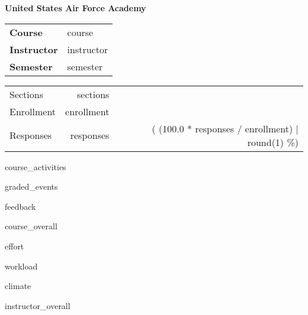 \documentclass{article}
\begin{document}
{\bfseries\large United States Air Force Academy}

\smallskip  %
\begin{minipage}{0.67\linewidth}
  \begin{tabular}{@{}>{\bfseries}ll}
    Course & {{ course }}\\
    Instructor & {{ instructor }}\\
    Semester & {{ semester }}\\
  \end{tabular}
\end{minipage}%
\begin{minipage}{0.33\linewidth}
  \hfill  %
  \begin{tabular}{l rr@{}}
    Sections & {{ sections }}\\
    Enrollment & {{ enrollment }}\\
    Responses & {{ responses }} & ({{ (100.0 * responses / enrollment) | round(1) }}\%)\\
  \end{tabular}
\end{minipage}
\medskip  %

{{ course_activities }}

{{ graded_events }}

{{ feedback }}

{{ course_overall }}

{{ effort }}

\clearpage  %
{{ workload }}

{{ climate }}

{{ instructor_overall }}

\end{document}
